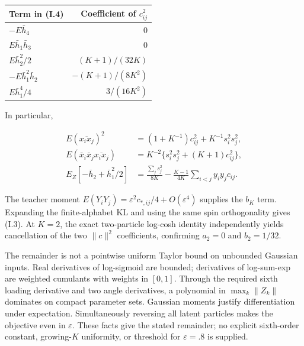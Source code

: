 \documentclass{article}
\begin{document}
\begin{longtable}[]{@{}lr@{}}
\toprule\noalign{}
Term in (I.4) & Coefficient of \(c_{ij}^2\) \\
\midrule\noalign{}
\endhead
\bottomrule\noalign{}
\endlastfoot
\(-E\bar h_4\) & \(0\) \\
\(E\bar h_1\bar h_3\) & \(0\) \\
\(E\bar h_2^2/2\) & \((K+1)/(32K)\) \\
\(-E\bar h_1^2\bar h_2\) & \(-(K+1)/(8K^2)\) \\
\(E\bar h_1^4/4\) & \(3/(16K^2)\) \\
\end{longtable}

In particular,

\[
\begin{aligned}
E(\overline{x_ix_j})^2&=(1+K^{-1})c_{ij}^2+K^{-1}s_i^2s_j^2,\\
E(\bar x_i\bar x_j\overline{x_ix_j})&=K^{-2}\{s_i^2s_j^2+(K+1)c_{ij}^2\},\\
E_Z[-\bar h_2+\bar h_1^2/2]
&=\frac{\sum_js_j^2}{8K}-\frac{K-1}{4K}\sum_{i<j}y_iy_jc_{ij}.
\end{aligned}
\tag{I.5}
\]

The teacher moment
\(E(Y_iY_j)=\varepsilon^2c_{*,ij}/4+O(\varepsilon^4)\) supplies the
\(b_K\) term. Expanding the finite-alphabet KL and using the same spin
orthogonality gives (I.3). At \(K=2\), the exact two-particle log-cosh
identity independently yields cancellation of the two \(\|c\|^2\)
coefficients, confirming \(a_2=0\) and \(b_2=1/32\).

The remainder is not a pointwise uniform Taylor bound on unbounded
Gaussian inputs. Real derivatives of log-sigmoid are bounded;
derivatives of log-sum-exp are weighted cumulants with weights in
\([0,1]\). Through the required sixth loading derivative and two angle
derivatives, a polynomial in \(\max_k\|Z_k\|\) dominates on compact
parameter sets. Gaussian moments justify differentiation under
expectation. Simultaneously reversing all latent particles makes the
objective even in \(\varepsilon\). These facts give the stated
remainder; no explicit sixth-order constant, growing-\(K\) uniformity,
or threshold for \(\varepsilon=.8\) is supplied.
\end{document}
